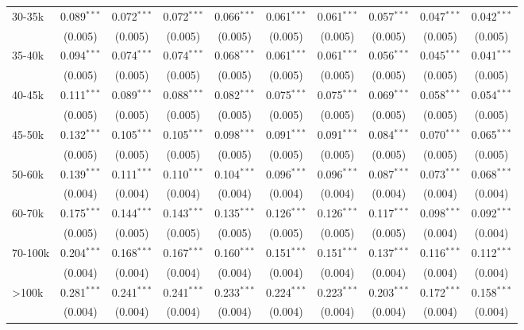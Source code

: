 \begin{table}[!htbp]
\begin{tabular}{@{\extracolsep{5pt}}lccccccccc}
  30-35k & 0.089$^{***}$ & 0.072$^{***}$ & 0.072$^{***}$ & 0.066$^{***}$ & 0.061$^{***}$ & 0.061$^{***}$ & 0.057$^{***}$ & 0.047$^{***}$ & 0.042$^{***}$ \\ 
  & (0.005) & (0.005) & (0.005) & (0.005) & (0.005) & (0.005) & (0.005) & (0.005) & (0.005) \\ 
  35-40k & 0.094$^{***}$ & 0.074$^{***}$ & 0.074$^{***}$ & 0.068$^{***}$ & 0.061$^{***}$ & 0.061$^{***}$ & 0.056$^{***}$ & 0.045$^{***}$ & 0.041$^{***}$ \\ 
  & (0.005) & (0.005) & (0.005) & (0.005) & (0.005) & (0.005) & (0.005) & (0.005) & (0.005) \\ 
  40-45k & 0.111$^{***}$ & 0.089$^{***}$ & 0.088$^{***}$ & 0.082$^{***}$ & 0.075$^{***}$ & 0.075$^{***}$ & 0.069$^{***}$ & 0.058$^{***}$ & 0.054$^{***}$ \\ 
  & (0.005) & (0.005) & (0.005) & (0.005) & (0.005) & (0.005) & (0.005) & (0.005) & (0.005) \\ 
  45-50k & 0.132$^{***}$ & 0.105$^{***}$ & 0.105$^{***}$ & 0.098$^{***}$ & 0.091$^{***}$ & 0.091$^{***}$ & 0.084$^{***}$ & 0.070$^{***}$ & 0.065$^{***}$ \\ 
  & (0.005) & (0.005) & (0.005) & (0.005) & (0.005) & (0.005) & (0.005) & (0.005) & (0.005) \\ 
  50-60k & 0.139$^{***}$ & 0.111$^{***}$ & 0.110$^{***}$ & 0.104$^{***}$ & 0.096$^{***}$ & 0.096$^{***}$ & 0.087$^{***}$ & 0.073$^{***}$ & 0.068$^{***}$ \\ 
  & (0.004) & (0.004) & (0.004) & (0.004) & (0.004) & (0.004) & (0.004) & (0.004) & (0.004) \\ 
  60-70k & 0.175$^{***}$ & 0.144$^{***}$ & 0.143$^{***}$ & 0.135$^{***}$ & 0.126$^{***}$ & 0.126$^{***}$ & 0.117$^{***}$ & 0.098$^{***}$ & 0.092$^{***}$ \\ 
  & (0.005) & (0.005) & (0.005) & (0.005) & (0.005) & (0.005) & (0.005) & (0.004) & (0.004) \\ 
  70-100k & 0.204$^{***}$ & 0.168$^{***}$ & 0.167$^{***}$ & 0.160$^{***}$ & 0.151$^{***}$ & 0.151$^{***}$ & 0.137$^{***}$ & 0.116$^{***}$ & 0.112$^{***}$ \\ 
  & (0.004) & (0.004) & (0.004) & (0.004) & (0.004) & (0.004) & (0.004) & (0.004) & (0.004) \\ 
  >100k & 0.281$^{***}$ & 0.241$^{***}$ & 0.241$^{***}$ & 0.233$^{***}$ & 0.224$^{***}$ & 0.223$^{***}$ & 0.203$^{***}$ & 0.172$^{***}$ & 0.158$^{***}$ \\ 
  & (0.004) & (0.004) & (0.004) & (0.004) & (0.004) & (0.004) & (0.004) & (0.004) & (0.004) \\ 

\end{tabular}
\end{table}
